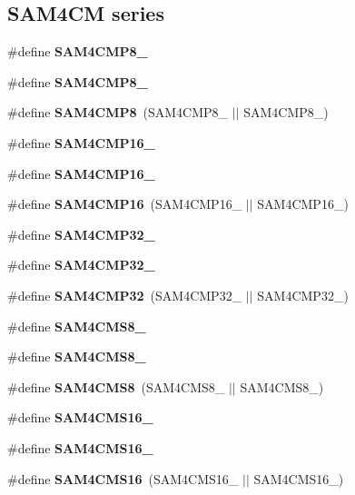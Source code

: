 \subsection*{S\-A\-M4\-C\-M series}
\begin{DoxyCompactItemize}
\item 
\#define {\bfseries S\-A\-M4\-C\-M\-P8\-\_}
\item 
\#define {\bfseries S\-A\-M4\-C\-M\-P8\-\_}
\item 
\hypertarget{group__sam__part__macros__group_gaa4e043324d8d27ea8696a3f7ec2bc418}{\#define {\bfseries S\-A\-M4\-C\-M\-P8}~(S\-A\-M4\-C\-M\-P8\-\_ $|$$|$ S\-A\-M4\-C\-M\-P8\-\_)}\label{group__sam__part__macros__group_gaa4e043324d8d27ea8696a3f7ec2bc418}

\item 
\#define {\bfseries S\-A\-M4\-C\-M\-P16\-\_}
\item 
\#define {\bfseries S\-A\-M4\-C\-M\-P16\-\_}
\item 
\hypertarget{group__sam__part__macros__group_gab16db9007bc5867acbea45ee0ff90d24}{\#define {\bfseries S\-A\-M4\-C\-M\-P16}~(S\-A\-M4\-C\-M\-P16\-\_ $|$$|$ S\-A\-M4\-C\-M\-P16\-\_)}\label{group__sam__part__macros__group_gab16db9007bc5867acbea45ee0ff90d24}

\item 
\#define {\bfseries S\-A\-M4\-C\-M\-P32\-\_}
\item 
\#define {\bfseries S\-A\-M4\-C\-M\-P32\-\_}
\item 
\hypertarget{group__sam__part__macros__group_ga136b64aeed2d33cfa1e286fc3c47a606}{\#define {\bfseries S\-A\-M4\-C\-M\-P32}~(S\-A\-M4\-C\-M\-P32\-\_ $|$$|$ S\-A\-M4\-C\-M\-P32\-\_)}\label{group__sam__part__macros__group_ga136b64aeed2d33cfa1e286fc3c47a606}

\item 
\#define {\bfseries S\-A\-M4\-C\-M\-S8\-\_}
\item 
\#define {\bfseries S\-A\-M4\-C\-M\-S8\-\_}
\item 
\hypertarget{group__sam__part__macros__group_gae28af08a186248f43e91ff3d12aa57d9}{\#define {\bfseries S\-A\-M4\-C\-M\-S8}~(S\-A\-M4\-C\-M\-S8\-\_ $|$$|$ S\-A\-M4\-C\-M\-S8\-\_)}\label{group__sam__part__macros__group_gae28af08a186248f43e91ff3d12aa57d9}

\item 
\#define {\bfseries S\-A\-M4\-C\-M\-S16\-\_}
\item 
\#define {\bfseries S\-A\-M4\-C\-M\-S16\-\_}
\item 
\hypertarget{group__sam__part__macros__group_gab78e397a8bc78b392f77abb18bbfa582}{\#define {\bfseries S\-A\-M4\-C\-M\-S16}~(S\-A\-M4\-C\-M\-S16\-\_ $|$$|$ S\-A\-M4\-C\-M\-S16\-\_)}\label{group__sam__part__macros__group_gab78e397a8bc78b392f77abb18bbfa582}


\end{DoxyCompactItemize}
